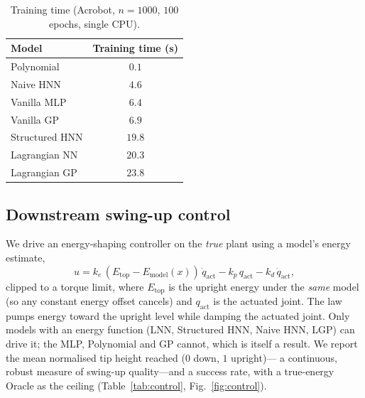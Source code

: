 \documentclass[conference]{IEEEtran}
\begin{document}
\begin{table}[t]
\caption{Training time (Acrobot, $n{=}1000$, $100$ epochs, single CPU).}
\label{tab:cost}
\centering
\begin{tabular}{lc}
\toprule
Model & Training time (s) \\
\midrule
Polynomial      & $0.1$ \\
Naive HNN       & $4.6$ \\
Vanilla MLP     & $6.4$ \\
Vanilla GP      & $6.9$ \\
Structured HNN  & $19.8$ \\
Lagrangian NN   & $20.3$ \\
Lagrangian GP   & $23.8$ \\
\bottomrule
\end{tabular}
\end{table}

\subsection{Downstream swing-up control}
\label{sec:control}
We drive an energy-shaping controller on the \emph{true} plant using a model's
energy estimate,
\begin{equation}
\label{eq:control}
u = k_e\,(E_{\mathrm{top}}-E_{\mathrm{model}}(x))\,\dot q_{\mathrm{act}}
   - k_p\,q_{\mathrm{act}} - k_d\,\dot q_{\mathrm{act}},
\end{equation}
clipped to a torque limit, where $E_{\mathrm{top}}$ is the upright energy under the
\emph{same} model (so any constant energy offset cancels) and $q_{\mathrm{act}}$ is
the actuated joint. The law pumps energy toward the upright level while damping the
actuated joint. Only models with an energy function (LNN, Structured HNN, Naive
HNN, LGP) can drive it; the MLP, Polynomial and GP cannot, which is itself a
result. We report the mean normalised tip height reached ($0$ down, $1$ upright)---
a continuous, robust measure of swing-up quality---and a success rate, with a
true-energy Oracle as the ceiling (Table~\ref{tab:control}, Fig.~\ref{fig:control}).
\end{document}
